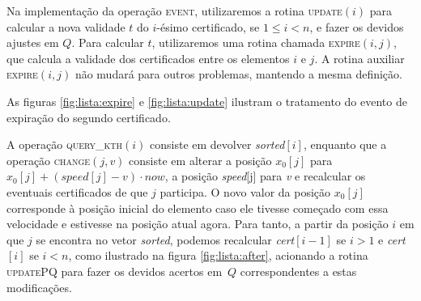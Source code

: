 

Na implementação da operação \textsc{event}, utilizaremos a rotina
\textsc{update}$(i)$ para calcular a nova validade $t$ do $i$-ésimo
certificado, se $1 \leq i < n$, e fazer os devidos ajustes em $Q$.
Para calcular $t$, utilizaremos uma rotina chamada
\textsc{expire}$(i, j)$, que calcula a validade dos certificados
entre os elementos $i$ e $j$. A rotina auxiliar \textsc{expire}$(i,
j)$ não mudará para outros problemas, mantendo a mesma definição.





As figuras \ref{fig:lista:expire} e \ref{fig:lista:update} ilustram
o tratamento do evento de expiração do segundo certificado.









A operação \textsc{query\_kth}$(i)$ consiste em devolver
\textit{sorted}$[i]$, enquanto que a operação \textsc{change}$(j,
v)$ consiste em alterar a posição $x_0[j]$ para $x_0[j] +
(\mathit{speed}[j] - v)\cdot now$, a posição \textit{speed}[j] para
\textit{v} e recalcular os eventuais certificados de que $j$
participa. O novo valor da posição $x_0[j]$ corresponde à posição
inicial do elemento caso ele tivesse começado com essa velocidade e
estivesse na posição atual agora. Para tanto, a partir da posição
$i$ em que $j$ se encontra no vetor \textit{sorted}, podemos
recalcular \textit{cert}$[i - 1]$ se $i > 1$ e \textit{cert}$[i]$ se
$i < n$, como ilustrado na figura \ref{fig:lista:after}, acionando
a rotina \textsc{updatePQ} para fazer os devidos acertos em~$Q$
correspondentes a estas modificações.


